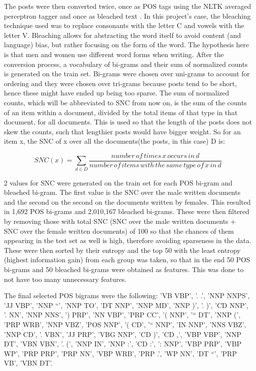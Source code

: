 The posts were then converted twice, once as POS tags using the NLTK averaged perceptron tagger and once as bleached text \cite{5}. In this project's case, the bleaching technique used was to replace consonants with the letter C and vowels with the letter V. Bleaching allows for abstracting the word itself to avoid content (and language) bias, but rather focusing on the form of the word. The hypothesis here is that men and women use different word forms when writing. After the conversion process, a vocabulary of bi-grams and their sum of normalized counts is generated on the train set. Bi-grams were chosen over uni-grams to account for ordering and they were chosen over tri-grams because posts tend to be short, hence these might have ended up being too sparse. The sum of normalized counts, which will be abbreviated to SNC from now on, is the sum of the counts of an item within a document, divided by the total items of that type in that document, for all documents. This is used so that the length of the posts does not skew the counts, such that lengthier posts would have bigger weight. So for an item x, the SNC of x over all the documents(the posts, in this case) D is: 

\[SNC(x) = \sum_{d \in D} \frac{number\, of\, times\, x\, occurs\, in\, d}{number\, of\, items\, with\, the\, same\, type\, of\, x\, in\, d}\]

2 values for SNC were generated on the train set for each POS bi-gram and bleached bi-gram. The first value is the SNC over the male written documents and the second on the second on the documents written by females. This resulted in 1,692 POS bi-grams and 2,010,167 bleached bi-grams. These were then filtered by removing those with total SNC (SNC over the male written documents + SNC over the female written documents) of 100 so that the chances of them appearing in the test set as well is high, therefore avoiding sparseness in the data. These were then sorted by their entropy and the top 50  with the least entropy (highest information gain) from each group was taken, so that in the end 50 POS bi-grams and 50 bleached bi-grams were obtained as features. This was done to not have too many unnecessary features.

The final selected POS bigrams were the following: 'VB VBP', '. .', 'NNP NNPS', 'JJ VBP', 'NNP ``', 'NNP TO', 'DT NNP', 'NNP MD', 'NNP )', '. )', 'CD NNP', '. NN', 'NNP NNS', ') PRP', 'NN VBP', 'PRP CC', '( NNP', '`` DT', 'NNP (', 'PRP WRB', 'NNP VBZ', 'POS NNP', '( CD', '`` NNP', 'IN NNP', 'NNS VBZ', 'NNP CD', '. VBN', 'JJ PRP', 'VBG NNP', 'CD )', 'CD ,', 'VBP VBP', 'NNP DT', 'VBN VBN', '. (', 'NNP IN', 'NNP :', 'CD :', ': NNP', 'VBP PRP', 'VBP WP', 'PRP PRP', 'PRP NN', 'VBP WRB', 'PRP .', 'WP NN', 'DT ``', 'PRP VB', 'VBN DT'.


